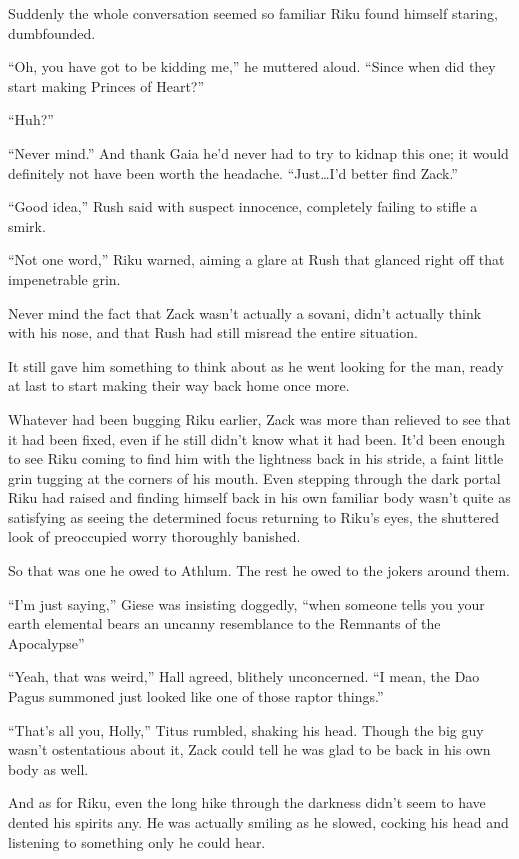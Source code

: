 Suddenly the whole conversation seemed so familiar Riku found himself staring, dumbfounded.

``Oh, you have got to be kidding me,'' he muttered aloud. ``Since when did they start making Princes of Heart?''

``Huh?''

``Never mind.'' And thank Gaia he'd never had to try to kidnap this one; it would definitely not have been worth the headache. ``Just\ldots I'd better find Zack.''

``Good idea,'' Rush said with suspect innocence, completely failing to stifle a smirk.

``Not one word,'' Riku warned, aiming a glare at Rush that glanced right off that impenetrable grin.

Never mind the fact that Zack wasn't actually a sovani, didn't actually think with his nose, and that Rush had still misread the entire situation.

It still gave him something to think about as he went looking for the man, ready at last to start making their way back home once more.


\scenechange


Whatever had been bugging Riku earlier, Zack was more than relieved to see that it had been fixed, even if he still didn't know what it had been. It'd been enough to see Riku coming to find him with the lightness back in his stride, a faint little grin tugging at the corners of his mouth. Even stepping through the dark portal Riku had raised and finding himself back in his own familiar body wasn't quite as satisfying as seeing the determined focus returning to Riku's eyes, the shuttered look of preoccupied worry thoroughly banished.

So that was one he owed to Athlum. The rest he owed to the jokers around them.

``I'm just saying,'' Giese was insisting doggedly, ``when someone tells you your earth elemental bears an uncanny resemblance to the Remnants of the Apocalypse\textemdash ''

``Yeah, that was weird,'' Hall agreed, blithely unconcerned. ``I mean, the Dao Pagus summoned just looked like one of those raptor things.''

``That's all you, Holly,'' Titus rumbled, shaking his head. Though the big guy wasn't ostentatious about it, Zack could tell he was glad to be back in his own body as well.

And as for Riku, even the long hike through the darkness didn't seem to have dented his spirits any. He was actually smiling as he slowed, cocking his head and listening to something only he could hear.

